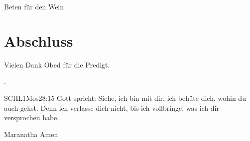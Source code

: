 \documentclass{../../inc/mybib}
\begin{document}
 Beten für den Wein


\section{Abschluss}
Vielen Dank Obed für die Predigt.

.

\beten{}

\begin{bibelbox}{SCHL}{1Mos}{28:15}
    Gott spricht: Siehe, ich bin mit dir,
    ich behüte dich, wohin du auch gehst.
    Denn ich verlasse dich nicht,
    bis ich vollbringe, was ich dir versprochen habe.
\end{bibelbox}

Maranatha Amen
\end{document}
